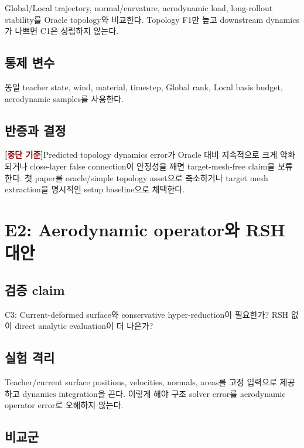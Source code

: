\documentclass[11pt,a4paper]{article}
\newcommand{\killgate}{\textcolor{darkred}{\textbf{[중단 기준]}}}
\begin{document}
Global/Local trajectory, normal/curvature, aerodynamic load,
long-rollout stability를 Oracle topology와 비교한다.
Topology F1만 높고 downstream dynamics가 나쁘면 C1은 성립하지 않는다.

\subsection*{통제 변수}

동일 teacher state, wind, material, timestep, Global rank,
Local basis budget, aerodynamic samples를 사용한다.

\subsection*{반증과 결정}

\killgate Predicted topology dynamics error가 Oracle 대비 지속적으로 크게 악화되거나
close-layer false connection이 안정성을 깨면 target-mesh-free claim을 보류한다.
첫 paper를 oracle/simple topology asset으로 축소하거나
target mesh extraction을 명시적인 setup baseline으로 채택한다.

\section{E2: Aerodynamic operator와 RSH 대안}

\subsection*{검증 claim}

C3: Current-deformed surface와 conservative hyper-reduction이 필요한가?
RSH 없이 direct analytic evaluation이 더 나은가?

\subsection*{실험 격리}

Teacher/current surface positions, velocities, normals, areas를 고정 입력으로 제공하고
dynamics integration을 끈다.
이렇게 해야 구조 solver error를 aerodynamic operator error로 오해하지 않는다.

\subsection*{비교군}
\end{document}
